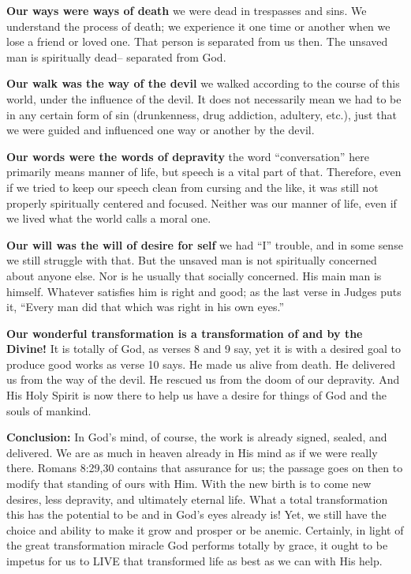 \begin{compactenum}[I.]
    \item \textbf{Our ways were ways of death} we were dead in trespasses and sins. We understand the process of death; we experience it one time or another when we lose a friend or loved one. That person is separated from us then. The unsaved man is spiritually dead-- separated from God.
    \item \textbf{Our walk was the way of the devil} we walked according to the course of this world, under the influence of the devil. It does not necessarily mean we had to be in any certain form of sin (drunkenness, drug addiction, adultery, etc.), just that we were guided and influenced one way or another by the devil.
    \item \textbf{Our words were the words of depravity} the word “conversation” here primarily means manner of life, but speech is a vital part of that. Therefore, even if we tried to keep our speech clean from cursing and the like, it was still not properly spiritually centered and focused. Neither was our manner of life, even if we lived what the world calls a moral one.
    \item \textbf{Our will was the will of desire for self} we had “I” trouble, and in some sense we still struggle with that. But the unsaved man is not spiritually concerned about anyone else. Nor is he usually that socially concerned. His main man is himself. Whatever satisfies him is right and good; as the last verse in Judges puts it, “Every man did that which was right in his own eyes.”
    \item \textbf{Our wonderful transformation is a transformation of and by the Divine!} It is totally of God, as verses 8 and 9 say, yet it is with a desired goal to produce good works as verse 10 says. He made us alive from death. He delivered us from the way of the devil. He rescued us from the doom of our depravity. And His Holy Spirit is now there to help us have a desire for things of God and the souls of mankind.
\end{compactenum}
\textbf{Conclusion:} In God’s mind, of course, the work is already signed, sealed, and delivered. We are as much in heaven already in His mind as if we were really there.   Romans 8:29,30 contains that assurance for us; the passage goes on then to modify that standing of ours with Him. With the new birth is to come new desires, less depravity, and ultimately eternal life. What a total transformation this has the potential to be and in God’s eyes already is! Yet, we still have the choice and ability to make it grow and prosper or be anemic. Certainly, in light of the great transformation miracle God performs totally by grace, it ought to be impetus for us to LIVE that transformed life as best as we can with His help.


